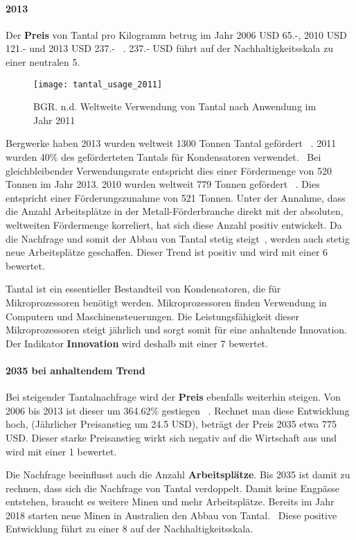 \paragraph{2013}
Der \textbf{Preis} von Tantal pro Kilogramm betrug im Jahr 2006 USD 65.-, 2010 USD 121.- und 2013 USD 237.- ~\cite{tantal_price2}. 237.- USD führt auf der Nachhaltigkeitsskala zu einer neutralen 5.

\begin{figure}[h]
\centering
\texttt{[image: tantal\_usage\_2011]}
\caption{BGR. n.d. Weltweite Verwendung von Tantal nach Anwendung im Jahr 2011 ~\cite{tantal_usage}}
\label{}
\end{figure}

Bergwerke haben 2013 wurden weltweit 1300 Tonnen Tantal gefördert ~\cite{tantal_price2}. 2011 wurden 40\% des geförderteten Tantals für Kondensatoren verwendet.~\cite{tantal_usage_2011} Bei gleichbleibender Verwendungsrate entspricht dies einer Fördermenge von 520 Tonnen im Jahr 2013. 2010 wurden weltweit 779 Tonnen gefördert ~\cite{tantal_price2}. Dies entspricht einer Förderungszunahme von 521 Tonnen. Unter der Annahme, dass die Anzahl Arbeitsplätze in der Metall-Förderbranche direkt mit der absoluten, weltweiten Fördermenge korreliert, hat sich diese Anzahl positiv entwickelt. 
Da die Nachfrage und somit der Abbau von Tantal stetig steigt~\cite{tantal_price2}, werden auch stetig neue Arbeitsplätze geschaffen. Dieser Trend ist positiv und wird mit einer 6 bewertet.

Tantal ist ein essentieller Bestandteil von Kondensatoren, die für Mikroprozessoren benötigt werden. Mikroprozessoren finden Verwendung in Computern und Maschinensteuerungen. Die Leistungsfähigkeit dieser Mikroprozessoren steigt jährlich und sorgt somit für eine anhaltende Innovation. Der Indikator \textbf{Innovation} wird deshalb mit einer 7 bewertet.

\paragraph{2035 bei anhaltendem Trend}
Bei steigender Tantalnachfrage wird der \textbf{Preis} ebenfalls weiterhin steigen. Von 2006 bis 2013 ist dieser um 364.62\% gestiegen ~\cite{tantal_price2}. Rechnet man diese Entwicklung hoch, (Jährlicher Preisanstieg um 24.5 USD), beträgt der Preis 2035 etwa 775 USD. Dieser starke Preisanstieg wirkt sich negativ auf die Wirtschaft aus und wird mit einer 1 bewertet.

Die Nachfrage beeinflusst auch die Anzahl \textbf{Arbeitsplätze}. Bis 2035 ist damit zu rechnen, dass sich die Nachfrage von Tantal verdoppelt. Damit keine Engpässe entstehen, braucht es weitere Minen und mehr Arbeitsplätze. Bereits im Jahr 2018 starten neue Minen in Australien den Abbau von Tantal.~\cite{new_mine_aus} Diese positive Entwicklung führt zu einer 8 auf der Nachhaltigkeitsskala.

